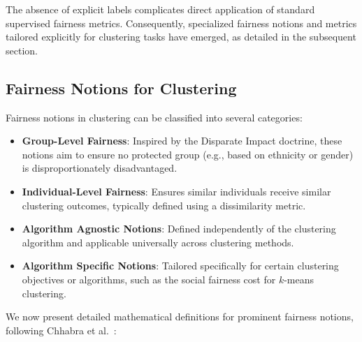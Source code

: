 The absence of explicit labels complicates direct application of standard supervised fairness metrics. Consequently, specialized fairness notions and metrics tailored explicitly for clustering tasks have emerged, as detailed in the subsequent section.

\subsection{Fairness Notions for Clustering}
Fairness notions in clustering can be classified into several categories:

\begin{itemize}
    \item \textbf{Group-Level Fairness}: Inspired by the Disparate Impact doctrine, these notions aim to ensure no protected group (e.g., based on ethnicity or gender) is disproportionately disadvantaged.
    \item \textbf{Individual-Level Fairness}: Ensures similar individuals receive similar clustering outcomes, typically defined using a dissimilarity metric.
    \item \textbf{Algorithm Agnostic Notions}: Defined independently of the clustering algorithm and applicable universally across clustering methods.
    \item \textbf{Algorithm Specific Notions}: Tailored specifically for certain clustering objectives or algorithms, such as the social fairness cost for \(k\)-means clustering.
\end{itemize}

We now present detailed mathematical definitions for prominent fairness notions, following Chhabra et al.~\cite{ChhabraOverview}:

